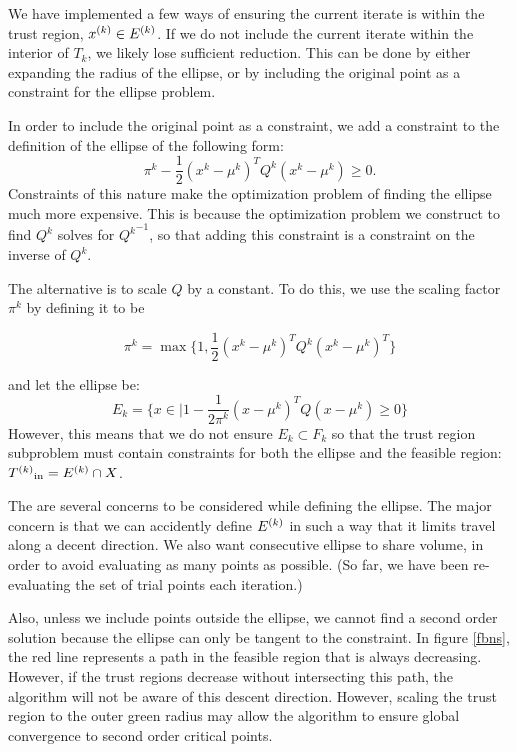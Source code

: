 We have implemented a few ways of ensuring the current iterate is within the trust region, ${x}^{(k)} \in {E^{(k)}}$.
If we do not include the current iterate within the interior of $T_{k}$, we likely lose sufficient reduction.
This can be done by either expanding the radius of the ellipse, or by including the original point as a constraint for the ellipse problem.


In order to include the original point as a constraint, we add a constraint to the definition of the ellipse of the following form:
$$ \pi^k - \frac 1 2 (x^k - \mu^{k})^TQ^{k}(x^k - \mu^{k}) \ge 0. $$
Constraints of this nature make the optimization problem of finding the ellipse much more expensive.
This is because the optimization problem we construct to find $Q^k$ solves for ${Q^k}^{-1}$, so that adding this constraint is a constraint on the inverse of $Q^k$.


The alternative is to scale $Q$ by a constant.
To do this, we use the scaling factor $\pi^k$ by defining it to be

$$\pi^k = \max \{1, \frac 1 {2} (x^{k} - \mu^{k})^T Q^k (x^{k} - \mu^{k})^T \}$$

and let the ellipse be:
$$E_k = \{x \in \mathbb | 1 - \frac 1 {2\pi^k} (x - \mu^{k})^T Q (x - \mu^{k}) \ge 0\} $$
However, this means that we do not ensure $E_k \subset F_k$ so that the trust region subproblem must contain constraints for both the ellipse and the feasible region: ${T^{(k)}}_{\text{in}} = {E^{(k)}} \cap X$.

The are several concerns to be considered while defining the ellipse.
The major concern is that we can accidently define ${E^{(k)}}$ in such a way that it limits travel along a decent direction.
We also want consecutive ellipse to share volume, in order to avoid evaluating as many points as possible.
(So far, we have been re-evaluating the set of trial points each iteration.)


Also, unless we include points outside the ellipse, we cannot find a second order solution because the ellipse can only be tangent to the constraint.
In figure \ref{fbns}, the red line represents a path in the feasible region that is always decreasing.
However, if the trust regions decrease without intersecting this path, the algorithm will not be aware of this descent direction.
However, scaling the trust region to the outer green radius may allow the algorithm to ensure global convergence to second order critical points.


